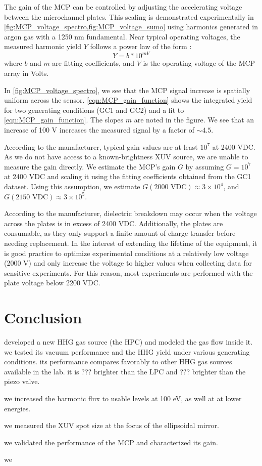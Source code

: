 The gain of the MCP can be controlled by adjusting the accelerating voltage between the microchannel plates. This scaling is demonstrated experimentally in \cref{fig:MCP_voltage_spectro,fig:MCP_voltage_sumo} using harmonics generated in argon gas with a 1250 nm fundamental. Near typical operating voltages, the measured harmonic yield $Y$ follows a power law of the form \cite{fraserGrayImagingUsing1984,ladislaswizaMicrochannelPlateDetectors1979a}:
\begin{equation}
Y = b * 10^{m V}
\label{eqn:MCP_gain_function}
\end{equation}
where $b$ and $m$ are fitting coefficients, and $V$ is the operating voltage of the MCP array in Volts.

In \cref{fig:MCP_voltage_spectro}, we see that the MCP signal increase is spatially uniform across the sensor. \cref{eqn:MCP_gain_function} shows the integrated yield for two generating conditions (GC1 and GC2) and a fit to \cref{eqn:MCP_gain_function}. The slopes $m$ are noted in the figure. We see that an increase of 100 V increases the measured signal by a factor of $\sim 4.5$.

According to the manafacturer, typical gain values are at least $10^7$ at 2400 VDC. As we do not have access to a known-brightness XUV source, we are unable to measure the gain directly. We estimate the MCP's gain $G$ by assuming $G = 10^7$ at 2400 VDC and scaling it using the fitting coefficients obtained from the GC1 dataset. Using this assumption, we estimate $G(\textrm{2000 VDC}) \approx 3 \times 10^4$, and $G(\textrm{2150 VDC}) \approx 3 \times 10^5$.

According to the manufacturer, dielectric breakdown may occur when the voltage across the plates is in excess of 2400 VDC. Additionally, the plates are consumable, as they only support a finite amount of charge transfer before needing replacement. In the interest of extending the lifetime of the equipment, it is good practice to optimize experimental conditions at a relatively low voltage (2000 V) and only increase the voltage to higher values when collecting data for sensitive experiments. For this reason, most experiments are performed with the plate voltage below 2200 VDC.


\section{Conclusion}

developed a new HHG gas source (the HPC) and modeled the gas flow inside it. we tested its vacuum performance and the HHG yield under various generating conditions. its performance compares favorably to other HHG gas sources available in the lab. it is ??? brighter than the LPC and ??? brighter than the piezo valve.

we increased the harmonic flux to usable levels at 100 eV, as well at at lower energies.

we measured the XUV spot size at the focus of the ellipsoidal mirror.

we validated the performance of the MCP and characterized its gain.

we 